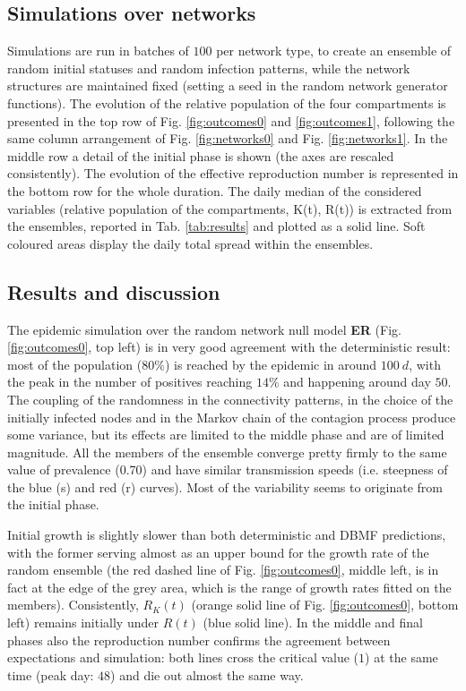 \documentclass[DIV=12, BCOR=0pt]{scrartcl}  %
\begin{document}
  \subsection{Simulations over networks}
  Simulations are run in batches of $100$ per network type, to create an ensemble of random initial statuses and random infection patterns, while the network structures are maintained fixed (setting a seed in the random network generator functions). The evolution of the relative population of the four compartments is presented in the top row of Fig. \ref{fig:outcomes0} and \ref{fig:outcomes1}, following the same column arrangement of Fig. \ref{fig:networks0} and Fig. \ref{fig:networks1}. In the middle row a detail of the initial phase is shown (the axes are rescaled consistently). The evolution of the effective reproduction number is represented in the bottom row for the whole duration. The daily median of the considered variables (relative population of the compartments, K(t), R(t)) is extracted from the ensembles, reported in Tab. \ref{tab:results} and plotted as a solid line. Soft coloured areas display the daily total spread within the ensembles.
  
  
  \subsection{Results and discussion}
  The epidemic simulation over the random network null model \textbf{ER} (Fig. \ref{fig:outcomes0}, top left) is in very good agreement with the deterministic result: most of the population ($80 \%$) is reached by the epidemic in around $100 \ d$, with the peak in the number of positives reaching $14 \%$ and happening around day $50$. The coupling of the randomness in the connectivity patterns, in the choice of the initially infected nodes and in the Markov chain of the contagion process produce some variance, but its effects are limited to the middle phase and are of limited magnitude. All the members of the ensemble converge pretty firmly to the same value of prevalence (0.70) and have similar transmission speeds (i.e. steepness of the blue (s) and red (r) curves). Most of the variability seems to originate from the initial phase.
  
  Initial growth is slightly slower than both deterministic and DBMF predictions, with the former serving almost as an upper bound for the growth rate of the random ensemble (the red dashed line of Fig. \ref{fig:outcomes0}, middle left, is in fact at the edge of the grey area, which is the range of growth rates fitted on the members). Consistently, $R_K(t)$ (orange solid line of Fig. \ref{fig:outcomes0}, bottom left) remains initially under $R(t)$ (blue solid line). In the middle and final phases also the reproduction number confirms the agreement between expectations and simulation: both lines cross the critical value ($1$) at the same time (peak day: $48$) and die out almost the same way.
  
\end{document}
